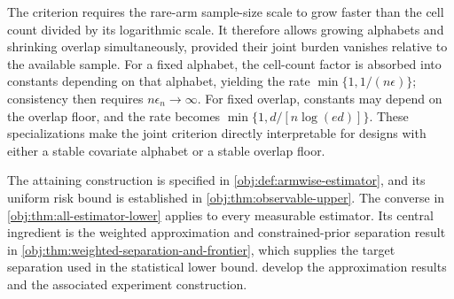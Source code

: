 The criterion requires the rare-arm sample-size scale to grow faster than the cell count divided by its logarithmic scale. It therefore allows growing alphabets and shrinking overlap simultaneously, provided their joint burden vanishes relative to the available sample. For a fixed alphabet, the cell-count factor is absorbed into constants depending on that alphabet, yielding the rate \(\min\{1,1/(n\epsilon)\}\); consistency then requires \(n\epsilon_n\to\infty\). For fixed overlap, constants may depend on the overlap floor, and the rate becomes \(\min\{1,d/[n\log(ed)]\}\). These specializations make the joint criterion directly interpretable for designs with either a stable covariate alphabet or a stable overlap floor.

The attaining construction is specified in \cref{obj:def:armwise-estimator}, and its uniform risk bound is established in \cref{obj:thm:observable-upper}. The converse in \cref{obj:thm:all-estimator-lower} applies to every measurable estimator. Its central ingredient is the weighted approximation and constrained-prior separation result in \cref{obj:thm:weighted-separation-and-frontier}, which supplies the target separation used in the statistical lower bound.  develop the approximation results and the associated experiment construction.
